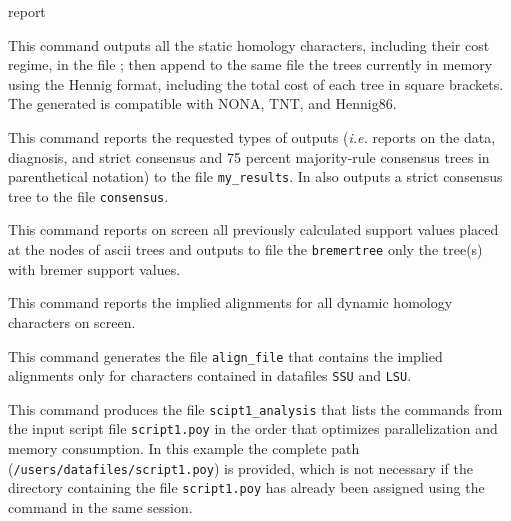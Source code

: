 \begin{command}{report}{}
\begin{poyexamples}
            {This command outputs all the static homology characters, including their cost
            regime, in the file ; then append to the same
            file the trees currently in memory using the Hennig format, 
            including the total cost of each tree in square brackets. The
            generated  is compatible with NONA, TNT, and
            Hennig86.
             }
            
         {This command reports the requested types of outputs (\emph{i.e.}
        reports on the data, diagnosis, and strict consensus and 75 percent
         majority-rule consensus trees in parenthetical notation) to the file
         \texttt{my\_results}. In also outputs a strict consensus tree to the file
         \texttt{consensus}.}
         
         {This command reports on screen all previously calculated support values
         placed at the nodes of ascii trees and outputs to file the \texttt{bremertree}
         only the tree(s) with bremer support values.}
         
         {This command reports the implied alignments for all dynamic homology
         characters on screen.}
         
          {This command generates the file \texttt{align\_file} that contains
          the implied alignments only for characters contained in datafiles
          \texttt{SSU} and \texttt{LSU}.}
          
          {This command produces the file \texttt{scipt1\_analysis} that lists the commands from
          the input script file \texttt{script1.poy} in the order that optimizes parallelization and
          memory consumption. In this example the complete path (\texttt{/users/datafiles/script1.poy})
          is provided, which is not necessary if the directory containing the file \texttt{script1.poy}
          has already been assigned using the command  in the same \poy session.}
          

\end{poyexamples}
\end{command}
